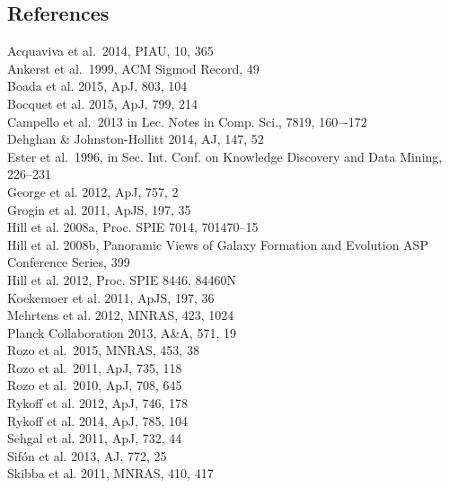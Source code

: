 \documentclass[overlapped, line, 11pt]{res}
\newcommand{\etal}{et al.}
\begin{document}
\begin{resume}
\section{\sc References}
\begin{multicols}{2}
{\small
\noindent Acquaviva \etal\ 2014, PIAU, 10, 365\\
Ankerst \etal\ 1999, ACM Sigmod Record, 49\\
Boada et al. 2015, ApJ, 803, 104\\
Bocquet et al. 2015, ApJ, 799, 214\\
Campello \etal\ 2013 in Lec. Notes in Comp. Sci., 7819, 160–-172\\
Dehghan \& Johnston-Hollitt 2014, AJ, 147, 52\\
Ester \etal\ 1996, in Sec. Int. Conf. on Knowledge Discovery and Data Mining, 226--231\\
George et al. 2012, ApJ, 757, 2\\
Grogin et al. 2011, ApJS, 197, 35\\
Hill et al. 2008a, Proc. SPIE 7014, 701470--15\\
Hill et al. 2008b, Panoramic Views of Galaxy Formation and Evolution ASP Conference Series, 399\\
Hill et al. 2012, Proc. SPIE 8446, 84460N\\
Koekemoer et al. 2011, ApJS, 197, 36\\
Mehrtens et al. 2012, MNRAS, 423, 1024\\
Planck Collaboration 2013, A\&A, 571, 19 \\
Rozo \etal\ 2015, MNRAS, 453, 38\\
Rozo \etal\ 2011, ApJ, 735, 118\\
Rozo \etal\ 2010, ApJ, 708, 645\\
Rykoff et al. 2012, ApJ, 746, 178 \\
Rykoff et al. 2014, ApJ, 785, 104 \\
Sehgal et al. 2011, ApJ, 732, 44\\
Sif\'{o}n et al. 2013, AJ, 772, 25\\
Skibba et al. 2011, MNRAS, 410, 417
}
\end{multicols}

\newpage
\renewcommand{\section}[2]{}%
\begin{multicols}{2}
   \small
   \renewcommand{\refname}{ \vspace{-\baselineskip}\vspace{-1.1mm} }
   
 \end{multicols}
\end{resume}
\end{document}
